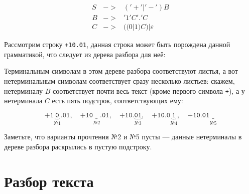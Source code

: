 \documentclass[12pt]{article}
\begin{document}
\begin{bnf}\begin{eqnarray*}
S &->& ('+'|'-') B\\
B &->& '1' C '.' C\\
C &->& ((0 | 1) C) | \varepsilon
\end{eqnarray*}\end{bnf}

Рассмотрим строку \verb!+10.01!, данная строка может быть порождена
данной грамматикой, что следует из дерева разбора для неё:

\begin{center}\end{center}

Терминальным символам в этом дереве разбора соответствуют листья,
а вот нетерминальным символам соответствует сразу несколько 
листьев: скажем, нетерминалу $B$ соответствует почти весь текст
(кроме первого символа \verb!+!), а у нетерминала $C$ есть пять
подстрок, соответствующих ему:

  $$\texttt{+1}\underbrace{\texttt{0}}_\textit{№1}\texttt{.01},\quad
    \texttt{+10}\underbrace{\texttt{}}_\textit{№2}\texttt{.01},\quad
    \texttt{+10.}\underbrace{\texttt{01}}_\textit{№3}\texttt{},\quad
    \texttt{+10.0}\underbrace{\texttt{1}}_\textit{№4}\texttt{},\quad
    \texttt{+10.01}\underbrace{\texttt{}}_\textit{№5}\texttt{}$$

Заметьте, что варианты прочтения №2 и №5 пусты --- данные нетерминалы в дереве
разбора раскрылись в пустую подстроку.

\section{Разбор текста}
\end{document}
